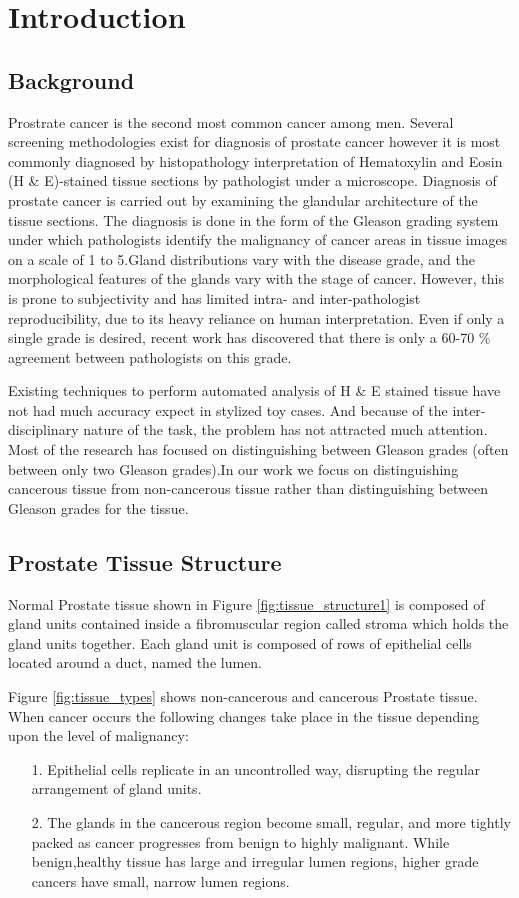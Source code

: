 \section{Introduction}
\label{sec:introduction}

\subsection{Background}
Prostrate cancer is the second most common cancer
among men. Several screening methodologies exist for diagnosis of prostate cancer however it is most commonly diagnosed by histopathology interpretation of Hematoxylin and Eosin (H \& E)-stained tissue sections by pathologist under a microscope. Diagnosis of prostate cancer is carried out by examining the glandular architecture of the tissue sections. The diagnosis is done in the form of the Gleason grading system \cite{gleason1966classification} under which pathologists identify the malignancy of cancer areas in tissue images on a scale of 1 to 5.Gland distributions vary with the disease grade, and the morphological features of the glands vary with the stage of cancer. However, this is prone to subjectivity and has limited intra- and inter-pathologist reproducibility, due to its heavy reliance on human interpretation. Even if only a single grade is desired, recent work has discovered that there is only a 60-70 \% agreement between pathologists on this grade.


Existing techniques to perform automated analysis of H \& E stained tissue have not had much accuracy expect in stylized toy cases. And because of the inter-disciplinary nature of the task, the problem has not attracted much attention. Most of the research has focused on distinguishing between Gleason grades (often between only two Gleason grades).In our work we focus on distinguishing cancerous tissue from non-cancerous tissue rather than distinguishing between Gleason grades for the tissue.

\subsection{Prostate Tissue Structure}
Normal Prostate tissue shown in Figure \ref{fig:tissue_structure1} is composed of gland units contained inside a fibromuscular region called stroma which holds the gland units together. Each gland unit is composed of rows of epithelial cells located around a duct, named the lumen. 

Figure \ref{fig:tissue_types} shows non-cancerous and cancerous Prostate tissue. When cancer occurs the following changes take place in the tissue depending upon the level of malignancy:
\begin{enumerate}
\item[1.] Epithelial cells replicate in an uncontrolled way, disrupting the regular arrangement of gland units.
\item[2.] The glands in the cancerous region become small, regular, and more tightly packed as
cancer progresses from benign to highly malignant. While benign,healthy tissue has large and irregular lumen regions, higher grade cancers have small, narrow lumen regions.
\end{enumerate}


